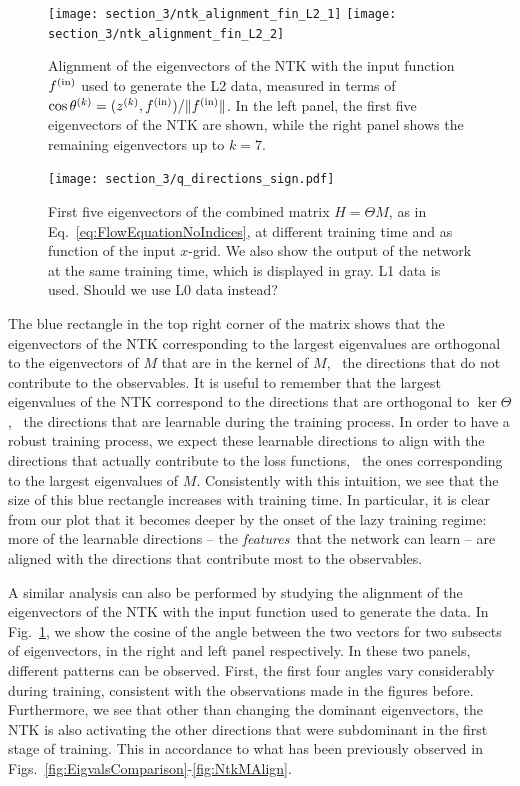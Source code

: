 \begin{figure}[ht!]
  \centering
  \texttt{[image: section\_3/ntk\_alignment\_fin\_L2\_1]}
  \texttt{[image: section\_3/ntk\_alignment\_fin\_L2\_2]}
  \caption{Alignment of the eigenvectors of the NTK with the input function
  $f^{\rm(in)}$ used to generate the L2 data, measured in terms of $\cos
  \theta^{(k)} = (z^{(k)}, f^{\rm{(in)}})/ \Vert f^{\rm{(in)}}\Vert$. In the
  left panel, the first five eigenvectors of the NTK are shown, while the right
  panel shows the remaining eigenvectors up to $k=7$.}
  \label{fig:NTKAlignFin}
\end{figure}
\begin{figure}[ht!]
  \centering
  \texttt{[image: section\_3/q\_directions\_sign.pdf]}
  \caption{First five eigenvectors of the combined matrix $H=\Theta M$, as in
  Eq.~\eqref{eq:FlowEquationNoIndices}, at different training time and as
  function of the input $x$-grid. We also show the output of the network at the
  same training time, which is displayed in gray. L1 data is used. \ac{Should we use L0
  data instead?}}
  \label{fig:NTKMEigVecs}
\end{figure}

The blue rectangle in the top right corner of the matrix shows that the
eigenvectors of the NTK corresponding to the largest eigenvalues are orthogonal
to the eigenvectors of $M$ that are in the kernel of $M$, \ie\ the directions
that do not contribute to the observables. It is useful to remember that the
largest eigenvalues of the NTK correspond to the directions that are orthogonal
to $\ker\Theta$, \ie\ the directions that are learnable during the training
process. In order to have a robust training process, we expect these learnable
directions to align with the directions that actually contribute to the loss
functions, \ie\ the ones corresponding to the largest eigenvalues of $M$.
Consistently with this intuition, we see that the size of this blue rectangle
increases with training time. In particular, it is clear from our plot that it
becomes deeper by the onset of the lazy training regime: more of the learnable
directions -- the {\it features}\ that the network can learn -- are aligned with
the directions that contribute most to the observables.

A similar analysis can also be performed by studying the alignment of the
eigenvectors of the NTK with the input function used to generate the data. In
Fig.~\ref{fig:NTKAlignFin}, we show the cosine of the angle between the two
vectors for two subsects of eigenvectors, in the right and left panel
respectively. In these two panels, different patterns can be observed. First,
the first four angles vary considerably during training, consistent with the
observations made in the figures before. Furthermore, we see that other than
changing the dominant eigenvectors, the NTK is also activating the other
directions that were subdominant in the first stage of training. This in
accordance to what has been previously observed in
Figs.~\ref{fig:EigvalsComparison}-\ref{fig:NtkMAlign}. 

